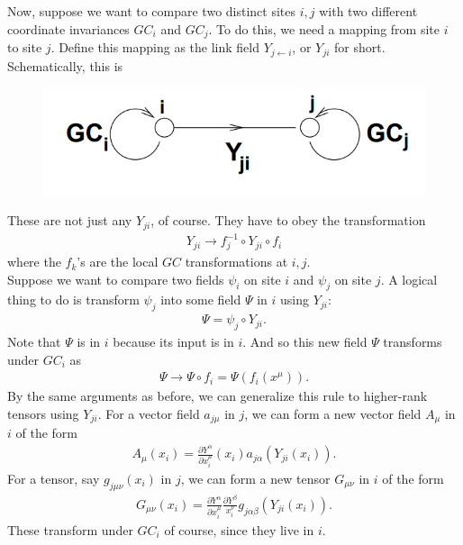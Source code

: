 \documentclass{book}
\theoremstyle{definition}
\newcommand{\p}{\partial}
\newcommand{\f}[2]{\frac{#1}{#2}}
\begin{document}
Now, suppose we want to compare two distinct sites $i,j$ with two different coordinate invariances $GC_i$ and $GC_j$. To do this, we need a mapping from site $i$ to site $j$. Define this mapping as the link field $Y_{j\leftarrow i}$, or $Y_{ji}$ for short. Schematically, this is 
\begin{figure}[!htb]
	\centering
	\includegraphics[scale=0.3]{link}
\end{figure}
These are not just any $Y_{ji}$, of course. They have to obey the transformation
\begin{align}
Y_{ji} \to f_j^{-1} \circ Y_{ji} \circ f_i
\end{align}
where the $f_k$'s are the local $GC$ transformations at $i,j$.\\

Suppose we want to compare two fields $\psi_i$ on site $i$ and $\psi_j$ on site $j$. A logical thing to do is transform $\psi_j$ into some field $\Psi$ in $i$ using $Y_{ji}$:
\begin{align}
\Psi = \psi_j \circ Y_{ji}.
\end{align}
Note that $\Psi$ is in $i$ because its input is in $i$. And so this new field $\Psi$ transforms under $GC_i$ as
\begin{align}
\Psi \to \Psi \circ f_i = \Psi(f_i(x^\mu)).
\end{align}
By the same arguments as before, we can generalize this rule to higher-rank tensors using $Y_{ji}$. For a vector field $a_{j\mu}$ in $j$, we can form a new vector field $A_\mu$ in $i$ of the form
\begin{align}
A_\mu(x_i) = \f{\p Y^\alpha}{\p x_i^\mu}(x_i) a_{j\alpha}(Y_{ji}(x_i)).
\end{align}
For a tensor, say $g_{j\mu\nu}(x_i)$ in $j$, we can form a new tensor $G_{\mu\nu}$ in $i$ of the form
\begin{align}
G_{\mu\nu}(x_i) = \f{\p Y^\alpha}{\p x_i^\mu}\f{\p Y^\beta}{x_i^\nu}g_{j\alpha\beta}(Y_{ji}(x_i)).
\end{align}
These transform under $GC_i$ of course, since they live in $i$.\\
\end{document}
